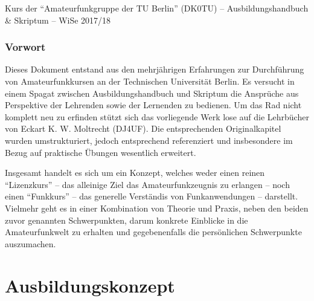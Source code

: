 \documentclass[ngerman, openany, twoside]{texdata/Script}
\begin{document}


%
  {\hspace{1em} Kurs der "`Amateurfunkgruppe der TU Berlin"' (DK0TU) \newline
   -- Ausbildungshandbuch \& Skriptum --}
  {WiSe 2017/18}%

\newpage

\newpage
\tableofcontents
\newpage


\section{Vorwort}

Dieses Dokument entstand aus den mehrjährigen Erfahrungen zur Durchführung von
Amateurfunkkursen an der Technischen Universität Berlin. Es versucht in einem
Spagat zwischen Ausbildungshandbuch und Skriptum die Ansprüche aus Perspektive
der Lehrenden sowie der Lernenden zu bedienen. Um das Rad nicht komplett neu zu
erfinden stützt sich das vorliegende Werk lose auf die Lehrbücher von Eckart K.
W. Moltrecht (DJ4UF). Die entsprechenden Originalkapitel wurden umstrukturiert,
jedoch entsprechend referenziert und insbesondere im Bezug auf praktische
Übungen wesentlich erweitert.

Insgesamt handelt es sich um ein Konzept, welches weder einen reinen
"`Lizenzkurs"' -- das alleinige Ziel das Amateurfunkzeugnis zu erlangen -- noch
einen "`Funkkurs"' -- das generelle Verständis von Funkanwendungen -- darstellt.
Vielmehr geht es in einer Kombination von Theorie und Praxis, neben den beiden
zuvor genannten Schwerpunkten, darum konkrete Einblicke in die Amateurfunkwelt
zu erhalten und gegebenenfalls die persönlichen Schwerpunkte auszumachen.


\setcounter{chapter}{10}
\part{Ausbildungskonzept}
\end{document}
